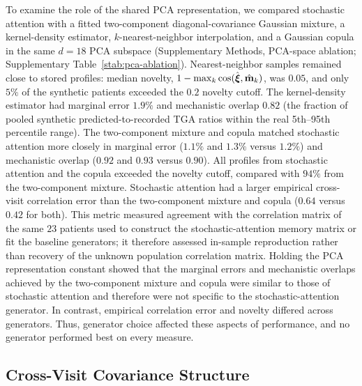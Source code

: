 To examine the role of the shared PCA representation, we compared stochastic attention
with a fitted two-component diagonal-covariance Gaussian mixture, a kernel-density estimator, $k$-nearest-neighbor interpolation, and a
Gaussian copula in the same $d{=}18$ PCA subspace
(Supplementary Methods, PCA-space ablation; Supplementary Table~\ref{stab:pca-ablation}).
Nearest-neighbor samples remained close to
stored profiles: median novelty, $1-\max_k\cos(\hat{\boldsymbol{\xi}},\hat{\mathbf{m}}_k)$, was $0.05$,
and only $5\%$ of the synthetic patients exceeded the $0.2$ novelty cutoff.
The kernel-density estimator had marginal error $1.9\%$ and mechanistic overlap $0.82$ (the fraction of pooled synthetic
predicted-to-recorded TGA ratios within the real 5th--95th percentile range). The two-component mixture and
copula matched stochastic attention more closely in marginal error ($1.1\%$ and $1.3\%$
versus $1.2\%$) and mechanistic overlap ($0.92$ and $0.93$ versus $0.90$). All profiles from
stochastic attention and the copula exceeded the novelty cutoff, compared with $94\%$ from
the two-component mixture. Stochastic attention had a larger empirical cross-visit correlation error
than the two-component mixture and copula ($0.64$ versus $0.42$ for both). This metric measured
agreement with the correlation matrix of the same $23$ patients used to construct the
stochastic-attention memory matrix or fit the baseline generators; it therefore assessed
in-sample reproduction rather than recovery of the unknown population correlation matrix.
Holding the PCA representation constant showed that the marginal errors and mechanistic
overlaps achieved by the two-component mixture and copula were similar to those of stochastic
attention and therefore were not specific to the stochastic-attention generator. In contrast,
empirical correlation error and novelty differed across generators. Thus, generator choice
affected these aspects of performance, and no generator performed best on every measure.

\subsection{Cross-Visit Covariance Structure}
\label{sec:results-l2}

